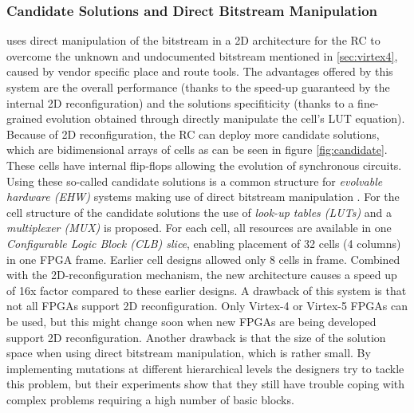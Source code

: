 \subsubsection{Candidate Solutions and Direct Bitstream Manipulation}
\label{sec:candidate}
\cite{virtex4} uses direct manipulation of the bitstream in a 2D architecture for the RC to overcome the unknown and undocumented bitstream mentioned in \ref{sec:virtex4}, caused by vendor specific place and route tools. The advantages offered by this system are the overall performance (thanks to the speed-up guaranteed by the internal 2D reconfiguration) and the solutions specifiticity (thanks to a fine-grained evolution obtained through directly manipulate the cell's LUT equation). Because of 2D reconfiguration, the RC can deploy more candidate solutions, which are bidimensional arrays of cells as can be seen in figure \ref{fig:candidate}. These cells have internal flip-flops allowing the evolution of synchronous circuits.  Using these so-called candidate solutions is a common structure for \emph{evolvable hardware (EHW)} systems making use of direct bitstream manipulation \cite{virtex4}. For the cell structure of the candidate solutions the use of \emph{look-up tables (LUTs)} and a \emph{multiplexer (MUX)} is proposed. For each cell, all resources are available in one \emph{Configurable Logic Block (CLB) slice}, enabling placement of 32 cells (4 columns) in one FPGA frame. Earlier cell designs allowed only 8 cells in frame. Combined with the 2D-reconfiguration mechanism, the new architecture causes a speed up of 16x factor compared to these earlier designs. A drawback of this system is that not all FPGAs support 2D reconfiguration. Only Virtex-4 or Virtex-5 FPGAs can be used\cite{virtex4}, but this might change soon when new FPGAs are being developed support 2D reconfiguration. Another drawback is that the size of the solution space when using direct bitstream manipulation, which is rather small. By implementing mutations at different hierarchical levels the designers try to tackle this problem, but their experiments show that they still have trouble coping with complex problems requiring a high number of basic blocks.

